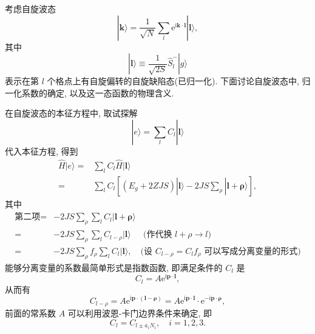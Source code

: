 \begin{note}
    考虑自旋波态
    \begin{equation}
        |\boldsymbol{k}\rangle=\frac{1}{\sqrt{N}}\sum_l\mathrm{e}^{\mathrm{i}\boldsymbol{k}\cdot \boldsymbol{l}}|\boldsymbol{l}\rangle,
    \end{equation}
    其中
    \begin{equation}
        |\boldsymbol{l} \rangle\equiv \frac{1}{\sqrt{2S}} \hat{S}_l^-|g\rangle
    \end{equation}
    表示在第 $l$ 个格点上有自旋偏转的自旋缺陷态(已归一化). 
    下面讨论自旋波态中, 归一化系数的确定, 以及这一态函数的物理含义. 

    在自旋波态的本征方程中, 取试探解
    \begin{equation}
        |e\rangle = \sum_l C_l|\boldsymbol{l}\rangle
    \end{equation}
    代入本征方程, 得到 
   \begin{align}
            \hat{H}|e\rangle =&\sum_l C_l\hat{H}|\boldsymbol{l}\rangle\nonumber\\
            =&\sum_l C_l\left[ \left( E_g+2ZJS \right)|\boldsymbol{l}\rangle-2JS\sum_\rho |\boldsymbol{l+\rho}\rangle \right],
        \end{align}
    其中 
    \begin{align}
            \text{第二项}=&-2JS\sum_\rho\sum_l C_l|\boldsymbol{l+\rho}\rangle\nonumber\\
            =&-2JS\sum_\rho \sum_{l}C_{l-\rho} |\boldsymbol{l}\rangle ~~\quad\text{(作代换 $l+\rho\to l$)}\nonumber\\
            =&-2JS\sum_\rho f_\rho\sum_l C_l|\boldsymbol{l}\rangle,  \quad\text{(设 $C_{l-\rho}=C_lf_\rho$ 可以写成分离变量的形式)}
        \end{align}
    能够分离变量的系数最简单形式是指数函数, 即满足条件的 $C_l$ 是
    \begin{equation}
        C_l=A\mathrm{e}^{\mathrm{i}\boldsymbol{p}\cdot \boldsymbol{l}},
    \end{equation}
    从而有
    \begin{equation}
        C_{l-\rho}=A\mathrm{e}^{\mathrm{i}\boldsymbol{p}\cdot(\boldsymbol{l}-\boldsymbol{\rho})}=A\mathrm{e}^{\mathrm{i}\boldsymbol{p}\cdot \boldsymbol{l}}\cdot \mathrm{e}^{-\mathrm{i}\boldsymbol{p}\cdot \boldsymbol{\rho}},
    \end{equation}
    前面的常系数 $A$ 可以利用波恩-卡门边界条件来确定, 即
    \begin{equation}
        C_{l}=C_{l\pm a_iN_i},\quad i=1,2,3.

\end{equation}
\end{note}
